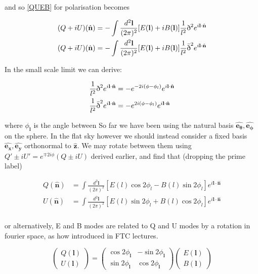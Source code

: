 \documentclass[a4paper,10pt]{article}
\renewcommand{\v}[1]{\mathbf{#1}}
\newcommand{\finttwo}[1]{\int \frac{d^2 \v{#1}}{(2\pi)^2}}
\newcommand{\unit}[1]{\hat{\v{#1}}}
\newcommand{\sr}{\text{\normalfont\dh}}
\renewcommand{\sl}{\bar{\text{\normalfont\dh}}}
\begin{document}
and so \ref{QUEB} for polarisation becomes

\begin{equation}\begin{split}
(Q+iU)(\unit{n}) &= -\finttwo{l} [E(\v{l})+iB(\v{l})]  \frac{1}{l^2}\sr^2e^{i\v{l}\cdot\unit{n}}\\
(Q+iU)(\unit{n}) &= -\finttwo{l} [E(\v{l})+iB(\v{l})] \frac{1}{l^2}\sl^2e^{i\v{l}\cdot\unit{n}}
\end{split}\end{equation}

In the small scale limit we can derive:

\begin{equation}\begin{split}
\frac{1}{l^2}\sr^2e^{i\v{l}\cdot\unit{n}} &= -e^{-2i(\phi-\phi_l)}e^{i\v{l}\cdot\unit{n}}\\
\frac{1}{l^2}\sl^2e^{i\v{l}\cdot\unit{n}} &= -e^{2i(\phi-\phi_l)}e^{i\v{l}\cdot\unit{n}}
\end{split}\end{equation}

where $\phi_\v{l}$ is the angle between So far we have been using the natural basis $\unit{e_\theta}, \unit{e_\phi}$ on the sphere. In the flat sky however we should instead consider a fixed basis $\unit{e_x}, \unit{e_y}$ orthonormal to $\unit{z}$. We may rotate between them using $Q'\pm iU' = e^{\mp 2i\phi}(Q\pm iU)$ derived earlier, and find that (dropping the prime label)

\begin{equation}\begin{split}
Q(\unit{n}) &= \finttwo{l} [E(l)\cos{2\phi_l}-B(l)\sin{2\phi_l}]  e^{i\v{l}\cdot\unit{n}}\\
U(\unit{n}) &= \finttwo{l} [E(l)\sin{2\phi_l}+B(l)\cos{2\phi_l}]  e^{i\v{l}\cdot\unit{n}}\\
\end{split}\end{equation}

or alternatively, E and B modes are related to Q and U modes by a rotation in fourier space, as how introduced in FTC lectures. 

\begin{equation}
\begin{pmatrix}
Q(\v{l})\\
U(\v{l}) 
\end{pmatrix}
=
\begin{pmatrix}
\cos{2\phi_\v{l}} & -\sin{2\phi_\v{l}}\\ 
\sin{2\phi_\v{l}} & \cos{2\phi_\v{l}}
\end{pmatrix}
\begin{pmatrix}
E(\v{l})\\
B(\v{l}) 
\end{pmatrix}
\end{equation}
\end{document}
